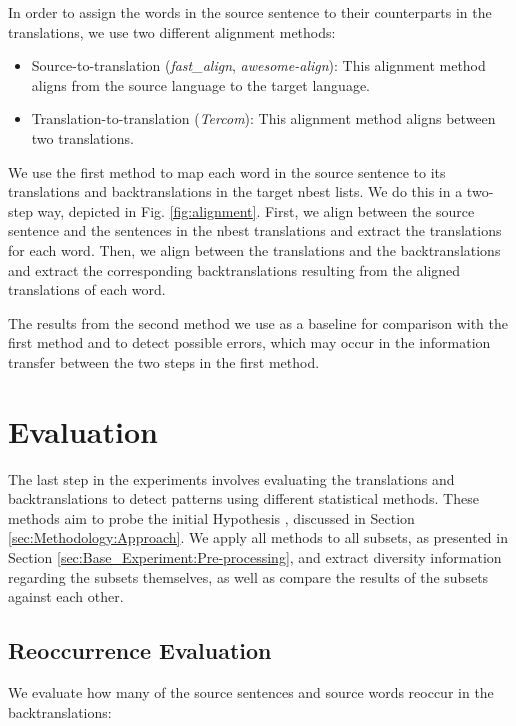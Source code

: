 In order to assign the words in the source sentence to their counterparts in the translations, we use two different alignment methods:

\begin{itemize}
    \item Source-to-translation (\textit{fast\_align}, \textit{awesome-align}): This alignment method aligns from the source language to the target language.
    \item Translation-to-translation (\textit{Tercom}): This alignment method aligns between two translations.
\end{itemize}

We use the first method to map each word in the source sentence to its translations and backtranslations in the target nbest lists. We do this in a two-step way, depicted in Fig. \ref{fig:alignment}. First, we align between the source sentence and the sentences in the nbest translations and extract the translations for each word. Then, we align between the translations and the backtranslations and extract the corresponding backtranslations resulting from the aligned translations of each word. 

The results from the second method we use as a baseline for comparison with the first method and to detect possible errors, which may occur in the information transfer between the two steps in the first method.

\section{Evaluation}
\label{sec:Base_Experiment:Evaluation}

The last step in the experiments involves evaluating the translations and backtranslations to detect patterns using different statistical methods. These methods aim to probe the initial Hypothesis , discussed in Section \ref{sec:Methodology:Approach}. We apply all methods to all subsets, as presented in Section \ref{sec:Base_Experiment:Pre-processing}, and extract diversity information regarding the subsets themselves, as well as compare the results of the subsets against each other.


\subsection{Reoccurrence Evaluation}
\label{sec:Base_Experiment:Statistics:Reoccurrence}
We evaluate how many of the source sentences and source words reoccur in the backtranslations:

